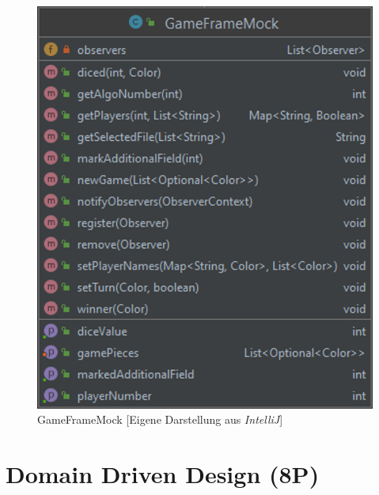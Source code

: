 \begin{figure}[htbp]
\centering
\centerline{\includegraphics[scale=.5]{gameframemock}}
\caption{GameFrameMock [Eigene Darstellung aus \emph{IntelliJ}]}
\label{fig:gameframemock}
\end{figure}

\newpage
\titlespacing*{\chapter}{0pt}{-30mm}{10pt}
  
\chapter{Domain Driven Design (8P)}
\pagestyle{scrheadings}
\clearscrheadfoot
{}
\setcounter{page}{25}
\ofoot[\pagemark]{\pagemark}
\onehalfspacing

